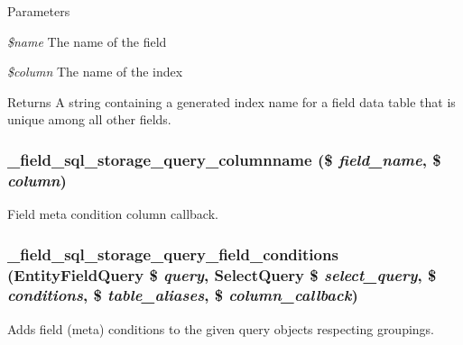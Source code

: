 \begin{DoxyParams}{Parameters}
\item[{\em \$name}]The name of the field \item[{\em \$column}]The name of the index \end{DoxyParams}
\begin{DoxyReturn}{Returns}
A string containing a generated index name for a field data table that is unique among all other fields. 
\end{DoxyReturn}
\hypertarget{field__sql__storage_8module_acf597397277e34b6a3621e2d2162e6d8}{
\subsubsection[{\_\-field\_\-sql\_\-storage\_\-query\_\-columnname}]{\setlength{\rightskip}{0pt plus 5cm}\_\-field\_\-sql\_\-storage\_\-query\_\-columnname (\$ {\em field\_\-name}, \/  \$ {\em column})}}
\label{field__sql__storage_8module_acf597397277e34b6a3621e2d2162e6d8}
Field meta condition column callback. \hypertarget{field__sql__storage_8module_a5d8aad839c8e69178faa95e4e4741133}{
\subsubsection[{\_\-field\_\-sql\_\-storage\_\-query\_\-field\_\-conditions}]{\setlength{\rightskip}{0pt plus 5cm}\_\-field\_\-sql\_\-storage\_\-query\_\-field\_\-conditions ({\bf EntityFieldQuery} \$ {\em query}, \/  {\bf SelectQuery} \$ {\em select\_\-query}, \/  \$ {\em conditions}, \/  \$ {\em table\_\-aliases}, \/  \$ {\em column\_\-callback})}}
\label{field__sql__storage_8module_a5d8aad839c8e69178faa95e4e4741133}
Adds field (meta) conditions to the given query objects respecting groupings.


